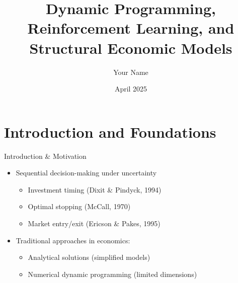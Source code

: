 \documentclass[10pt]{beamer}
\title{Dynamic Programming, Reinforcement Learning, and Structural Economic Models}
\date{April 2025}
\author{Your Name}
\institute{University Department}
\begin{document}
\maketitle


\section{Introduction and Foundations}


\begin{frame}{Introduction \& Motivation}
    \begin{itemize}
        \item Sequential decision-making under uncertainty
        \begin{itemize}
            \item Investment timing (Dixit \& Pindyck, 1994)
            \item Optimal stopping (McCall, 1970)
            \item Market entry/exit (Ericson \& Pakes, 1995)
        \end{itemize}
        \vspace{0.2cm}
        \item Traditional approaches in economics:
        \begin{itemize}
            \item Analytical solutions (simplified models)
            \item Numerical dynamic programming (limited dimensions)
        \end{itemize}
    \end{itemize}
\end{frame}
\end{document}
